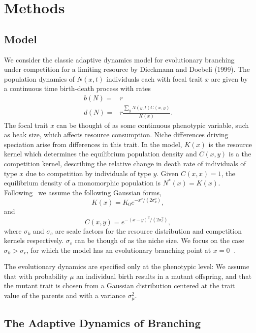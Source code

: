 \documentclass[authoryear,review,11pt]{elsarticle}
\begin{document}
\section{Methods}
\subsection{Model}
We consider the classic adaptive dynamics model for evolutionary branching under competition for a limiting resource by Dieckmann and Doebeli (1999).  The population dynamics of $N(x,t)$ individuals each with focal trait $x$ are given by a continuous time birth-death process with rates 
\begin{align}
b(N) = & r \nonumber \\
d(N) = & r \frac{\sum_yN(y,t)C(x,y)}{K(x)} .\label{general_logistic}
\end{align}
The focal trait $x$ can be thought of as some continuous phenotypic variable, such as beak size, which affects resource consumption.  Niche differences driving speciation arise from differences in this trait.  In the model, $K(x)$ is the resource kernel which determines the equilibrium population density and $C(x,y)$ is a the competition kernel, describing the relative change in death rate of individuals of type $x$ due to competition by individuals of type $y$.  Given $C(x,x)=1$, the equilibrium density of a monomorphic population is $N^{\ast}(x)=K(x)$.  Following~\citet{dieckmann_nat1999} we assume the following Gaussian forms,
\begin{equation}
K(x)=K_0e^{-x^2/(2\sigma_k^2)}, \label{K}
\end{equation}
and
\begin{equation}
C(x,y)=e^{-(x-y)^2/(2\sigma_c^2)}, \label{C}
\end{equation}
where $\sigma_k$ and $\sigma_c$ are scale factors for the resource distribution and competition kernels respectively.  $\sigma_c$ can be though of as the niche size.  We focus on the case $\sigma_k>\sigma_c$, for which the model has an evolutionary branching point at $x=0$~\citep{geritz_evoeco1998}.  

The evolutionary dynamics are specified only at the phenotypic level: We assume that with probability $\mu$ an individual birth results in a mutant offspring, and that the mutant trait is chosen from a Gaussian distribution centered at the trait value of the parents and with a variance $\sigma_{\mu}^2$. 


\subsection{The Adaptive Dynamics of Branching}
\end{document}
